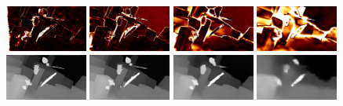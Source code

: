 \documentclass[runningheads]{llncs}
\begin{document}
\begin{figure}[!htbp]
\begin{center}
        \\
        \includegraphics[width=0.24\textwidth,clip]{figures/pred_0_err.png}
        \includegraphics[width=0.24\textwidth,clip]{figures/pred_1_err.png}
        \includegraphics[width=0.24\textwidth,clip]{figures/pred_2_err.png}
        \includegraphics[width=0.24\textwidth,clip]{figures/pred_3_err.png}
        \\
        \includegraphics[width=0.24\textwidth,clip]{figures/pred_comb_0.png}
        \includegraphics[width=0.24\textwidth,clip]{figures/pred_comb_1.png}
        \includegraphics[width=0.24\textwidth,clip]{figures/pred_comb_2.png}
        \includegraphics[width=0.24\textwidth,clip]{figures/pred_comb_3.png}
        \\

\end{center}
\end{figure}
\end{document}
